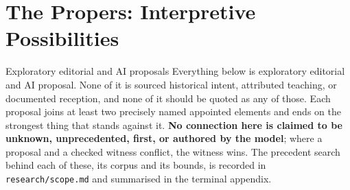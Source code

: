 \sectionguard
\section*{The Propers: Interpretive Possibilities}

\begin{studybox}{Exploratory editorial and AI proposals}
Everything below is exploratory editorial and AI proposal. None of it is
sourced historical intent, attributed teaching, or documented reception, and
none of it should be quoted as any of those. Each proposal joins at least two
precisely named appointed elements and ends on the strongest thing that stands
against it. \textbf{No connection here is claimed to be unknown, unprecedented,
first, or authored by the model}; where a proposal and a checked witness
conflict, the witness wins. The precedent search behind each of these, its
corpus and its bounds, is recorded in \texttt{research/scope.md} and summarised
in the terminal appendix.
\end{studybox}

